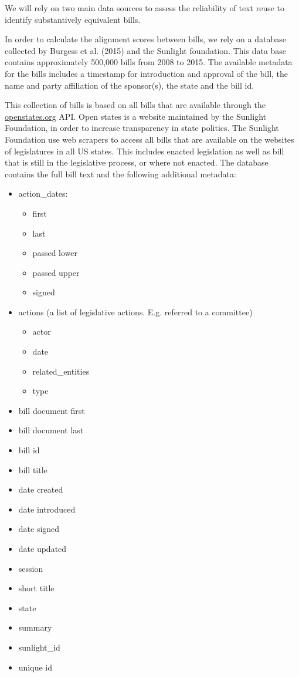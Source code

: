 \documentclass[12pt]{article} %
\begin{document}
We will rely on two main data sources to assess the reliability of text reuse to
identify substantively equivalent bills. 

In order to calculate the alignment scores between bills, we rely on a database collected by Burgess et al. (2015) and the Sunlight foundation. This data base contains approximately 500,000
bills from 2008 to 2015. The available metadata for the bills includes a timestamp for introduction and approval of the bill, the name and party affiliation of the sponsor(s), the state and the bill id. 

This collection of bills is based on all bills that are available through the \url{openstates.org} API. Open states is a website maintained by the Sunlight Foundation, in order to increase transparency in state politics. The Sunlight Foundation use web scrapers to access all bills that are available on the websites of legislatures in all US states. This includes enacted legislation as well as bill that is still in the legislative process, or where not enacted. The database contains the full bill text and the following additional metadata:

\begin{itemize}
    \item action\_dates:
        \begin{itemize}
            \item first
            \item last
            \item passed lower
            \item passed upper
            \item signed
        \end{itemize}
    \item actions (a list of legislative actions. E.g. referred to a committee)
        \begin{itemize}
            \item actor
            \item date 
            \item related\_entities 
            \item type
        \end{itemize}
    \item bill document first
    \item bill document last
    \item bill id
    \item bill title
    \item date created
    \item date introduced
    \item date signed
    \item date updated
    \item session
    \item short title
    \item state
    \item summary
    \item sunlight\_id
    \item unique id
\end{itemize}
\end{document}
